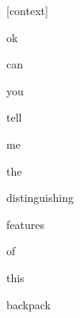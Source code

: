 \documentclass[varwidth]{standalone}
\begin{document}
\begin{CJK*}{UTF8}{gbsn}
{\setlength{\fboxsep}{0pt}\colorbox{white!0}{\parbox{0.9\textwidth}{
\colorbox{red!4.8579857462818736e-17}{\strut [context]} \colorbox{red!4.3053302078988054e-07}{\strut ok} \colorbox{red!7.548898395270953e-08}{\strut can} \colorbox{red!1.8961366095027188e-06}{\strut you} \colorbox{red!0.0005722562200389802}{\strut tell} \colorbox{red!0.0019156092312186956}{\strut me} \colorbox{red!0.0029244059696793556}{\strut the} \colorbox{red!29.103836059570312}{\strut distinguishing} \colorbox{red!28.52916145324707}{\strut features} \colorbox{red!37.30184555053711}{\strut of} \colorbox{red!4.507928848266602}{\strut this} \colorbox{red!0.5518088340759277}{\strut backpack} 
}}}
\end{CJK*}
\end{document}
